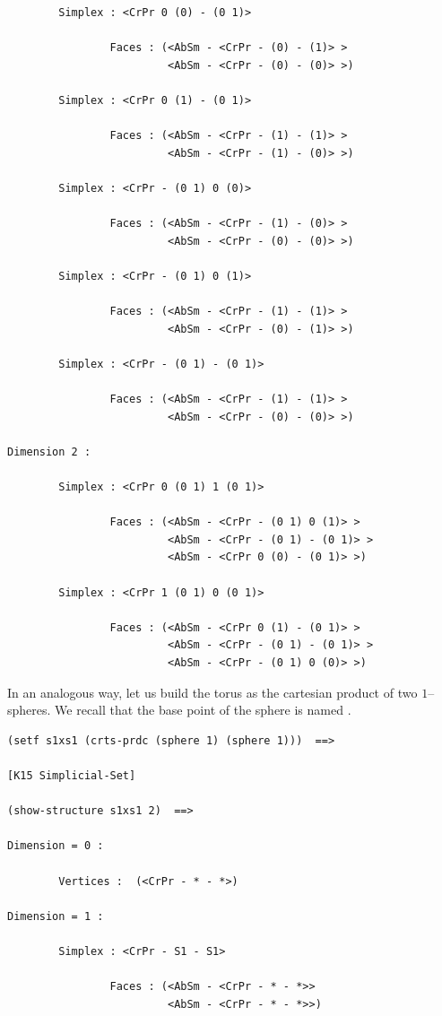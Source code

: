 {{\begin{verbatim}
        Simplex : <CrPr 0 (0) - (0 1)>

                Faces : (<AbSm - <CrPr - (0) - (1)> >
                         <AbSm - <CrPr - (0) - (0)> >)

        Simplex : <CrPr 0 (1) - (0 1)>

                Faces : (<AbSm - <CrPr - (1) - (1)> >
                         <AbSm - <CrPr - (1) - (0)> >)

        Simplex : <CrPr - (0 1) 0 (0)>

                Faces : (<AbSm - <CrPr - (1) - (0)> >
                         <AbSm - <CrPr - (0) - (0)> >)

        Simplex : <CrPr - (0 1) 0 (1)>

                Faces : (<AbSm - <CrPr - (1) - (1)> >
                         <AbSm - <CrPr - (0) - (1)> >)

        Simplex : <CrPr - (0 1) - (0 1)>

                Faces : (<AbSm - <CrPr - (1) - (1)> >
                         <AbSm - <CrPr - (0) - (0)> >)

Dimension 2 :

        Simplex : <CrPr 0 (0 1) 1 (0 1)>

                Faces : (<AbSm - <CrPr - (0 1) 0 (1)> >
                         <AbSm - <CrPr - (0 1) - (0 1)> >
                         <AbSm - <CrPr 0 (0) - (0 1)> >)

        Simplex : <CrPr 1 (0 1) 0 (0 1)>

                Faces : (<AbSm - <CrPr 0 (1) - (0 1)> >
                         <AbSm - <CrPr - (0 1) - (0 1)> >
                         <AbSm - <CrPr - (0 1) 0 (0)> >)
\end{verbatim}}
In an analogous way, let us build the torus as the cartesian product
of two $1$--spheres. We recall that the base point of the sphere is named {\tt *}.
{\footnotesize\begin{verbatim}
(setf s1xs1 (crts-prdc (sphere 1) (sphere 1)))  ==>

[K15 Simplicial-Set]

(show-structure s1xs1 2)  ==>

Dimension = 0 :

        Vertices :  (<CrPr - * - *>)

Dimension = 1 :

        Simplex : <CrPr - S1 - S1>

                Faces : (<AbSm - <CrPr - * - *>>
                         <AbSm - <CrPr - * - *>>)


\end{verbatim}}}

